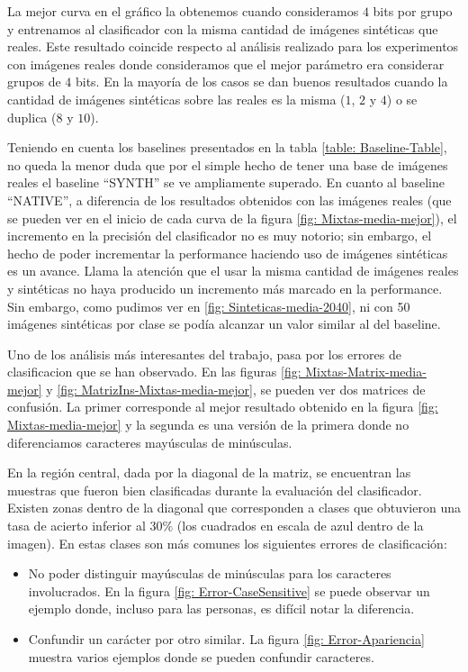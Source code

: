 	 La mejor curva en el gráfico la obtenemos cuando consideramos $4$ bits por grupo y entrenamos al clasificador con la misma cantidad de imágenes sintéticas que reales. Este resultado coincide respecto al análisis realizado para los experimentos con imágenes reales donde consideramos que el mejor parámetro era considerar grupos de $4$ bits. En la mayoría de los casos se dan buenos resultados cuando la cantidad de imágenes sintéticas sobre las reales es la misma ($1$, $2$ y $4$) o se duplica ($8$ y $10$).
	 
	 Teniendo en cuenta los baselines presentados en la tabla \ref{table: Baseline-Table}, no queda la menor duda que por el simple hecho de tener una base de imágenes reales el baseline ``SYNTH'' se ve ampliamente superado. En cuanto al baseline ``NATIVE'', a diferencia de los resultados obtenidos con las imágenes reales (que se pueden ver en el inicio de cada curva de la figura \ref{fig: Mixtas-media-mejor}), el incremento en la precisión del clasificador no es muy notorio; sin embargo, el hecho de poder incrementar la performance haciendo uso de imágenes sintéticas es un avance. Llama la atención que el usar la misma cantidad de imágenes reales y sintéticas no haya producido un incremento más marcado en la performance. Sin embargo, como pudimos ver en \ref{fig: Sinteticas-media-2040}, ni con 50 imágenes sintéticas por clase se podía alcanzar un valor similar al del baseline.

	Uno de los análisis más interesantes del trabajo, pasa por los errores de clasificacion que se han observado. En las figuras \ref{fig: Mixtas-Matrix-media-mejor} y \ref{fig: MatrizIns-Mixtas-media-mejor}, se pueden ver dos matrices de confusión. La primer corresponde al mejor resultado obtenido en la figura \ref{fig: Mixtas-media-mejor} y la segunda es una versión de la primera donde no diferenciamos caracteres mayúsculas de minúsculas.
	
	En la región central, dada por la diagonal de la matriz, se encuentran las muestras que fueron bien clasificadas durante la evaluación del clasificador. Existen zonas dentro de la diagonal que corresponden a clases que obtuvieron una tasa de acierto inferior al $30\%$ (los cuadrados en escala de azul dentro de la imagen). En estas clases son más comunes los siguientes errores de clasificación: 
	
	\begin{itemize}
		\item No poder distinguir mayúsculas de minúsculas para los caracteres involucrados. En la figura \ref{fig: Error-CaseSensitive} se puede observar un ejemplo donde, incluso para las personas, es difícil notar la diferencia.
		\item Confundir un carácter por otro similar. La figura \ref{fig: Error-Apariencia} muestra varios ejemplos donde se pueden confundir caracteres.
	\end{itemize}		
	
